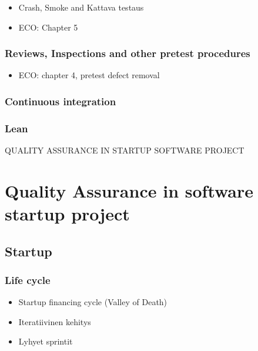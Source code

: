 \documentclass[12pt,a4paper,finnish]{tutthesis}
\begin{document}
 \begin{itemize}
 
 \item Crash, Smoke and Kattava testaus
 
 \item ECO: Chapter 5
 
 \end{itemize}
 
 \subsection{Reviews, Inspections and other pretest procedures}
 
 \begin{itemize}
  
 \item ECO: chapter 4, pretest defect removal
 
 \end{itemize}
 
 \subsection{Continuous integration}
 
 \subsection{Lean}

	QUALITY ASSURANCE IN STARTUP SOFTWARE PROJECT
 
 \chapter{Quality Assurance in software startup project}

 \section{Startup}
 
 \subsection{Life cycle}

 \begin{itemize}

 \item Startup financing cycle (Valley of Death)
 \item Iteratiivinen kehitys
 \item Lyhyet sprintit
 
 \end{itemize}
 
\end{document}
